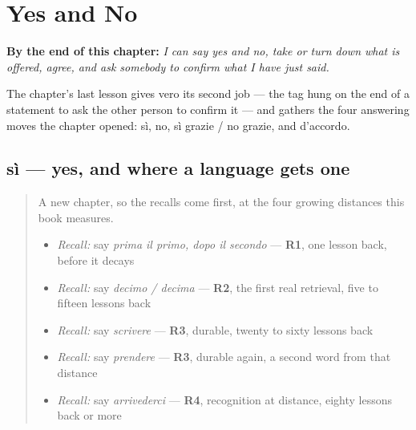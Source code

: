 
\chapter{Yes and No}
\label{ch:it-si-e-no}

\begin{chapteropening}
\textbf{By the end of this chapter:} \emph{I can say yes and no, take or turn down what is offered, agree, and ask somebody to confirm what I have just said.}

The chapter's last lesson gives vero its second job — the tag hung on the end of a statement to ask the other person to confirm it — and gathers the four answering moves the chapter opened: sì, no, sì grazie / no grazie, and d'accordo.
\end{chapteropening}

\section[sì]{sì — yes, and where a language gets one}

\label{lesson:IT-C29-si}



\begin{quote}
A new chapter, so the recalls come first, at the four growing distances this book measures.

\begin{itemize}
\raggedright
  \item \emph{Recall:} say \emph{prima il primo, dopo il secondo} — \textbf{R1}, one lesson back, before it decays
  \item \emph{Recall:} say \emph{decimo / decima} — \textbf{R2}, the first real retrieval, five to fifteen lessons back
  \item \emph{Recall:} say \emph{scrivere} — \textbf{R3}, durable, twenty to sixty lessons back
  \item \emph{Recall:} say \emph{prendere} — \textbf{R3}, durable again, a second word from that distance
  \item \emph{Recall:} say \emph{arrivederci} — \textbf{R4}, recognition at distance, eighty lessons back or more
\end{itemize}
\end{quote}


